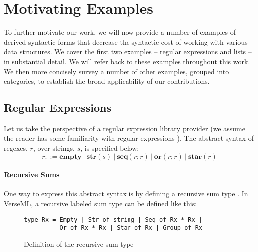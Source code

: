 
\section{Motivating Examples}\label{sec:motivating-examples}
To further motivate our work, we will now provide a number of examples of derived syntactic forms that decrease the syntactic cost of working with various data structures. We cover the first two examples -- regular expressions and lists -- in substantial detail. We will refer back to these examples throughout this work. We then more concisely survey a number of other examples, grouped into  categories, to establish the broad applicability of our contributions. %

\subsection{Regular Expressions}\label{sec:syntax-examples-regexps}
Let us take the perspective of a regular expression library provider (we assume the reader has some familiarity with regular expressions \cite{Thompson:1968:PTR:363347.363387}). The abstract syntax of {regexes}, $r$, over strings, $s$, is specified below:\[r ::= \textbf{empty} ~|~ \textbf{str}(s) ~|~ \textbf{seq}(r; r) ~|~ \textbf{or}(r; r) ~|~ \textbf{star}(r)\]

\paragraph{Recursive Sums}
One way to express this abstract syntax is by defining a recursive sum type \cite{pfpl}. In VerseML, a recursive labeled sum type can be defined like this:

\begin{figure}[ht]
\begin{lstlisting}[numbers=none]
type Rx = Empty | Str of string | Seq of Rx * Rx | 
          Or of Rx * Rx | Star of Rx | Group of Rx
\end{lstlisting}
\caption{Definition of the recursive sum type }
\label{fig:datatype-rx}
\end{figure}


